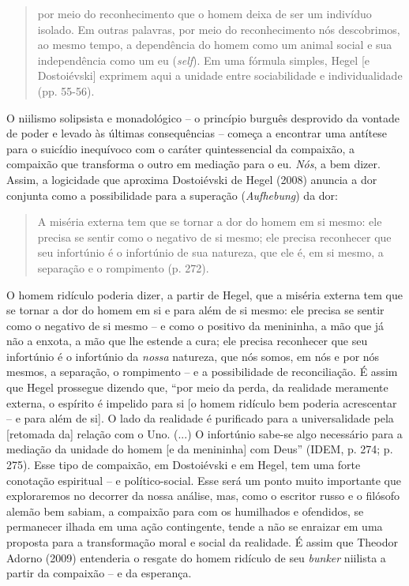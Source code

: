 \begin{quote}
por meio do reconhecimento que o homem deixa de ser um indivíduo
isolado. Em outras palavras, por meio do reconhecimento nós descobrimos,
ao mesmo tempo, a dependência do homem como um animal social e sua
independência como um eu (\emph{self}). Em uma fórmula simples, Hegel
{[}e Dostoiévski{]} exprimem aqui a unidade entre sociabilidade e
individualidade (pp. 55-56).
\end{quote}

O niilismo solipsista e monadológico -- o princípio burguês desprovido
da vontade de poder e levado às últimas consequências -- começa a
encontrar uma antítese para o suicídio inequívoco com o caráter
quintessencial da compaixão, a compaixão que transforma o outro em
mediação para o eu. \emph{Nós}, a bem dizer. Assim, a logicidade que
aproxima Dostoiévski de Hegel (2008) anuncia a dor conjunta como a
possibilidade para a superação (\emph{Aufhebung}) da dor:

\begin{quote}
A miséria externa tem que se tornar a dor do homem em si mesmo: ele
precisa se sentir como o negativo de si mesmo; ele precisa reconhecer
que seu infortúnio é o infortúnio de sua natureza, que ele é, em si
mesmo, a separação e o rompimento (p. 272).
\end{quote}

O homem ridículo poderia dizer, a partir de Hegel, que a miséria externa
tem que se tornar a dor do homem em si e para além de si mesmo: ele
precisa se sentir como o negativo de si mesmo -- e como o positivo da
menininha, a mão que já não a enxota, a mão que lhe estende a cura; ele
precisa reconhecer que seu infortúnio é o infortúnio da \emph{nossa}
natureza, que nós somos, em nós e por nós mesmos, a separação, o
rompimento -- e a possibilidade de reconciliação. É assim que Hegel
prossegue dizendo que, ``por meio da perda, da realidade meramente
externa, o espírito é impelido para si {[}o homem ridículo bem poderia
acrescentar -- e para além de si{]}. O lado da realidade é purificado
para a universalidade pela {[}retomada da{]} relação com o Uno. (...) O
infortúnio sabe-se algo necessário para a mediação da unidade do homem
{[}e da menininha{]} com Deus'' (IDEM, p. 274; p. 275). Esse tipo de
compaixão, em Dostoiévski e em Hegel, tem uma forte conotação espiritual
-- e político-social. Esse será um ponto muito importante que
exploraremos no decorrer da nossa análise, mas, como o escritor russo e
o filósofo alemão bem sabiam, a compaixão para com os humilhados e
ofendidos, se permanecer ilhada em uma ação contingente, tende a não se
enraizar em uma proposta para a transformação moral e social da
realidade. É assim que Theodor Adorno (2009) entenderia o resgate do
homem ridículo de seu \emph{bunker} niilista a partir da compaixão -- e
da esperança.

